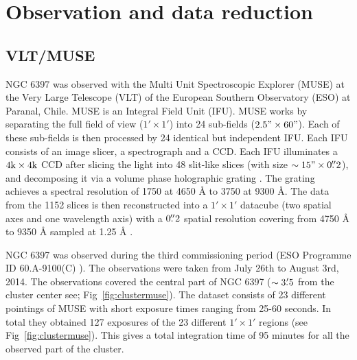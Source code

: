 \chapter{Observation and data reduction}\label{chap:data}
\thispagestyle{fancy}

\section{VLT/MUSE}

NGC 6397 was observed with the Multi Unit Spectroscopic Explorer (MUSE) at the Very Large Telescope (VLT) of the European Southern Observatory (ESO) at Paranal, Chile. MUSE is an Integral Field Unit (IFU). MUSE works by separating the full field of view ($1' \times 1'$) into 24 sub-fields ($2.5" \times 60"$). Each of these sub-fields is then processed by 24 identical but independent IFU. Each IFU consists of an image slicer, a spectrograph and a CCD. Each IFU illuminates a $4 \text k \times 4 \text k$ CCD after slicing the light into 48 slit-like slices (with size $\sim 15" \times 0\mbox{$.\!\!^{\prime\prime}$}2$), and decomposing it via a volume phase holographic grating \citep{barden_volume-phase_1998}. The grating achieves a spectral resolution of 1750 at 4650 Å to 3750 at 9300 Å. The data from the 1152 slices is then reconstructed into a $1' \times 1'$ datacube (two spatial axes and one wavelength axis) with a $0\mbox{$.\!\!^{\prime\prime}$}2$ spatial resolution covering from 4750 Å to 9350 Å sampled at 1.25 Å \citep{bacon_muse_2010}. 

NGC 6397 was observed during the third commissioning period  (ESO Programme ID 60.A-9100(C) \citealp{bacon_muse_2014}). The observations were taken from July 26th to August 3rd, 2014. The observations covered the central part of NGC 6397 ($\sim 3\mbox{$.\mkern-4mu^\prime$}5$ from the cluster center see; Fig~\ref{fig:clustermuse}). The dataset consists of 23 different pointings of MUSE with short exposure times ranging from 25-60 seconds. In total they obtained 127 exposures of the 23 different $1' \times 1'$ regions (see Fig~\ref{fig:clustermuse}). This gives a total integration time of 95 minutes for all the observed part of the cluster.


